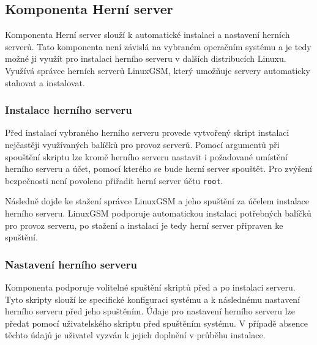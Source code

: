 \subsection{Komponenta Herní server}

Komponenta Herní server slouží k automatické instalaci a nastavení herních serverů. Tato komponenta není závislá na
vybraném operačním systému a je tedy možné ji využít pro instalaci herního serveru v dalších distribucích Linuxu.
Využívá správce herních serverů LinuxGSM, který umožňuje servery automaticky stahovat a instalovat.

\subsubsection{Instalace herního serveru}

Před instalací vybraného herního serveru provede vytvořený skript instalaci nejčastěji využívaných balíčků pro provoz serverů.
Pomocí argumentů při spouštění skriptu lze kromě herního serveru nastavit i požadované umístění herního serveru a účet, pomocí kterého
se bude herní server spouštět. Pro zvýšení bezpečnosti není povoleno přiřadit herní server účtu \texttt{root}.

Následně dojde ke stažení správce LinuxGSM a jeho spuštění za účelem instalace herního serveru. LinuxGSM podporuje automatickou instalaci
potřebných balíčků pro provoz serveru, po stažení a instalaci je tedy herní server připraven ke spuštění.

\subsubsection{Nastavení herního serveru}

Komponenta podporuje volitelné spuštění skriptů před a po instalaci serveru. Tyto skripty slouží
ke specifické konfiguraci systému a k následnému nastavení herního serveru před jeho spuštěním.
Údaje pro nastavení herního serveru lze předat pomocí uživatelského skriptu před spuštěním systému. V případě absence těchto údajů
je uživatel vyzván k jejich doplnění v průběhu instalace.